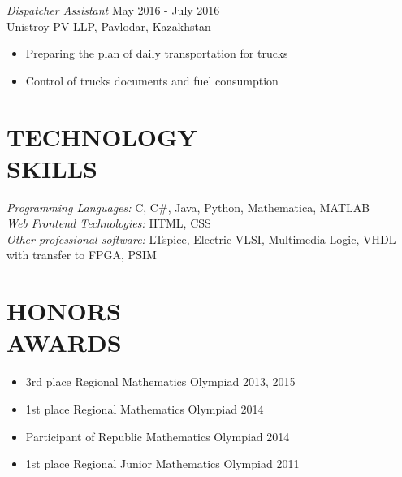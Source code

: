 \documentclass[margin, 10pt]{res} %
\begin{document}
\begin{resume}
{\sl Dispatcher Assistant} \hfill May 2016 - July 2016 \\
Unistroy-PV LLP, Pavlodar, Kazakhstan
\begin{itemize}
\item Preparing the plan of daily transportation for trucks
\item Control of trucks documents and fuel consumption
\end{itemize} 




\section{TECHNOLOGY \\ SKILLS} 

{\sl Programming Languages:} C, C\#, Java, Python, Mathematica, MATLAB \\
{\sl Web Frontend Technologies:} HTML, CSS  \\
{\sl Other professional software:}   LTspice, Electric VLSI, Multimedia Logic, VHDL with transfer to FPGA, PSIM
 

\section{HONORS \\ AWARDS}
\begin{itemize}
\item 3rd place Regional Mathematics Olympiad \hfill 2013, 2015 
\item 1st place Regional Mathematics Olympiad  \hfill 2014 
\item Participant of Republic Mathematics Olympiad \hfill 2014 

\item 1st place Regional Junior Mathematics Olympiad \hfill 2011 

\end{itemize}



\end{resume}
\end{document}
